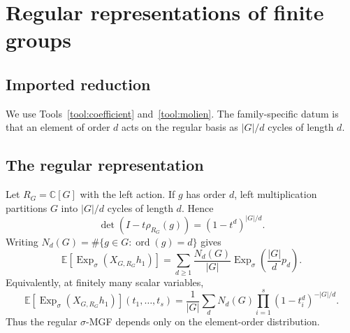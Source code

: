 \documentclass[10pt]{article}
\newcommand{\Sym}{\operatorname{Sym}}
\newcommand{\ExpS}{\operatorname{Exp}_{\sigma}}
\newcommand{\smgv}[2]{\mathbb E\!\left[\ExpS\!\left(X_{#1,#2}h_1\right)\right]}
\newcommand{\E}{\mathbb E}
\begin{document}
\section{Regular representations of finite groups}\label{proof:regular-representations}
\begingroup
\providecommand{\Sym}{\operatorname{Sym}}
\renewcommand{\Sym}{\operatorname{Sym}}
\providecommand{\Exp}{\operatorname{Exp}_{\sigma}}
\renewcommand{\Exp}{\operatorname{Exp}_{\sigma}}
\providecommand{\E}{\mathbf E}
\renewcommand{\E}{\mathbf E}
\providecommand{\tr}{\operatorname{Tr}}
\renewcommand{\tr}{\operatorname{Tr}}
\providecommand{\ord}{\operatorname{ord}}
\renewcommand{\ord}{\operatorname{ord}}
\setcounter{theorem}{0}
\setcounter{proposition}{0}
\setcounter{lemma}{0}
\setcounter{corollary}{0}
\setcounter{remark}{0}
\begin{abstract}
Using the imported coefficient and Molien identities, we derive the
element-order formula for the regular $\sigma$-MGF and then test the regular
representations of $C_5$, $D_4$ (order $8$), $S_3$, and $A_4$.  Every group is
constructed as a concrete left-regular matrix group.  Coefficients are computed
by an explicit Reynolds projector and compared with an independent order-count
formula; the full rational functions are also compared at safe numerical
specializations.  All reported cases agree to at least $10^{-14}$.
\end{abstract}

\subsection{Imported reduction}
We use Tools~\ref{tool:coefficient} and~\ref{tool:molien}. The
family-specific datum is that an element of order $d$ acts on the regular
basis as $|G|/d$ cycles of length $d$.

\subsection{The regular representation}
Let $R_G=\mathbb C[G]$ with the left action.  If $g$ has order $d$, left
multiplication partitions $G$ into $|G|/d$ cycles of length $d$.  Hence
\[
 \det(I-t\rho_{R_G}(g))=(1-t^d)^{|G|/d}.
\]
Writing $N_d(G)=\#\{g\in G:\ord(g)=d\}$ gives
\begin{equation}
 \boxed{\displaystyle
 \smgv{G}{R_G}=
 \sum_{d\geq1}\frac{N_d(G)}{|G|}
 \Exp\!\left(\frac{|G|}{d}p_d\right).}
 \label{regular-representations-proof-and-verification:eq:regular}
\end{equation}
Equivalently, at finitely many scalar variables,
\[
 \smgv{G}{R_G}(t_1,\ldots,t_s)
 =\frac1{|G|}\sum_dN_d(G)
   \prod_{i=1}^s(1-t_i^d)^{-|G|/d}.
\]
Thus the regular $\sigma$-MGF depends only on the element-order distribution.
\end{document}
